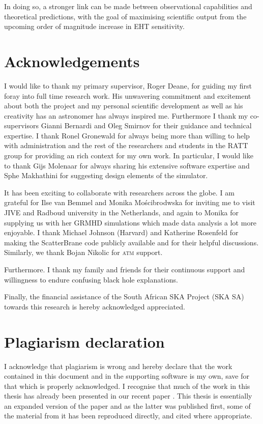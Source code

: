 
In doing so, a stronger link can be made between observational capabilities and theoretical predictions, with the goal of maximising scientific output from the upcoming order of magnitude increase in EHT sensitivity. 


 
\chapter*{Acknowledgements}
I would like to thank my primary supervisor, Roger Deane, for guiding my first foray into full time research work. His unwavering commitment and excitement about both the project and my personal scientific development as well as his creativity has an astronomer has always inspired me. Furthermore I thank my co-supervisors Gianni Bernardi and Oleg Smirnov for their guidance and technical expertise. I thank Ronel Gronewald for always being more than willing to help with administration and the rest of the researchers and students in the RATT group for providing an rich context for my own work. In particular, I would like to thank Gijs Molenaar for always sharing his extensive software expertise and Sphe Makhathini for suggesting design elements of the simulator. 


It has been exciting to collaborate with researchers across the globe. I am grateful for Ilse van Bemmel and Monika Mo\'{s}cibrodwska for inviting me to visit JIVE and Radboud university in the Netherlands, and again to Monika for supplying us with her GRMHD simulations which made data analysis a lot more enjoyable. I thank Michael Johnson (Harvard) and Katherine Rosenfeld for making the {\sc ScatterBrane} code publicly available and for their helpful discussions. Similarly, we thank Bojan Nikolic for \textsc{atm} support.  

Furthermore. I thank my family and friends for their continuous support and willingness to endure confusing black hole explanations.

Finally, the financial assistance of the South African SKA Project (SKA SA) towards this research is hereby acknowledged appreciated. 

\chapter*{Plagiarism declaration}
 I acknowledge that plagiarism is wrong and hereby declare that the work contained in this document and in the supporting software is my own, save for that which is properly acknowledged. I recognise that much of the work in this thesis has already been presented in our recent paper \citet{Blecher_2016}. This thesis is essentially an expanded version of the paper and as the latter was published first, some of the material from it has been reproduced directly, and cited where appropriate. 
 \vspace{55pt}
 
